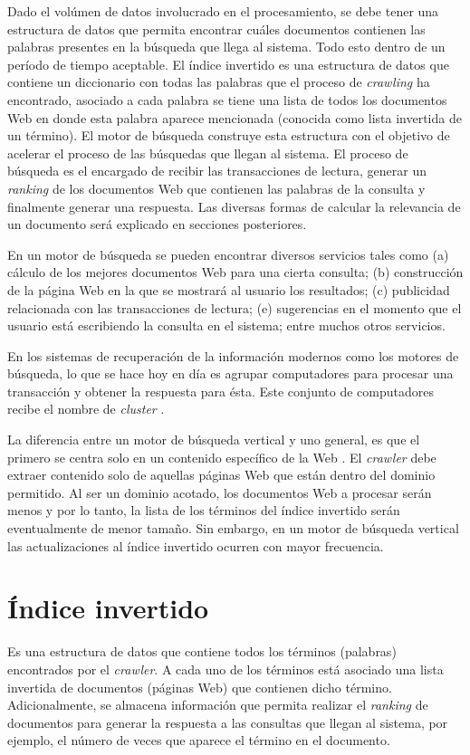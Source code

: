 Dado el volúmen de datos involucrado en el procesamiento, se debe tener una estructura de datos que permita encontrar cuáles documentos contienen las palabras presentes en la búsqueda que llega al sistema. Todo esto dentro de un período de tiempo aceptable. El índice invertido \citep{Zobel:2006} es una estructura de datos que contiene un diccionario con todas las palabras que el proceso de \textit{crawling} ha encontrado, asociado a cada palabra se tiene una lista de todos los documentos Web en donde esta palabra aparece mencionada (conocida como lista invertida de un término). El motor de búsqueda construye esta estructura con el objetivo de acelerar el proceso de las búsquedas que llegan al sistema. El proceso de búsqueda es el encargado de recibir las transacciones de lectura, generar un \textit{ranking} de los documentos Web que contienen las palabras de la consulta y finalmente generar una respuesta. Las diversas formas de calcular la relevancia de un documento será explicado en secciones posteriores.

En un motor de búsqueda se pueden encontrar diversos servicios tales como (a) cálculo de los mejores documentos Web para una cierta consulta; (b) construcción de la página Web en la que se mostrará al usuario los resultados; (c) publicidad relacionada con las transacciones de lectura; (e) sugerencias en el momento que el usuario está escribiendo la consulta en el sistema; entre muchos otros servicios.

En los sistemas de recuperación de la información modernos como los motores de búsqueda, lo que se hace hoy en día es agrupar computadores para procesar una transacción y obtener la respuesta para ésta. Este conjunto de computadores recibe el nombre de \textit{cluster} \citep{Dean:2009}.

La diferencia entre un motor de búsqueda vertical y uno general, es que el primero se centra solo en un contenido específico de la Web \citep{Gil-Costa:2013}. El \textit{crawler} debe extraer contenido solo de aquellas páginas Web que están dentro del dominio permitido. Al ser un dominio acotado, los documentos Web a procesar serán menos y por lo tanto, la lista de los términos del índice invertido serán eventualmente de menor tamaño. Sin embargo, en un motor de búsqueda vertical las actualizaciones al índice invertido ocurren con mayor frecuencia.

\section{\'Indice invertido}
\label{marco:ii}
Es una estructura de datos que contiene todos los términos (palabras) encontrados por el \textit{crawler}. A cada uno de los términos está asociado una lista invertida de documentos (páginas Web) que contienen dicho término. Adicionalmente, se almacena información que permita realizar el \textit{ranking} de documentos para generar la respuesta a las consultas que llegan al sistema, por ejemplo, el número de veces que aparece el término en el documento.

